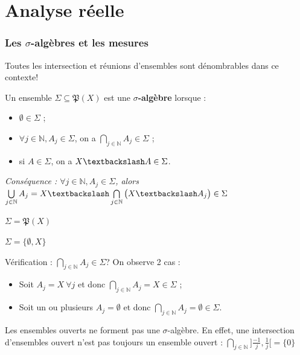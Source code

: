 \part{Analyse réelle}

\section{Les $\sigma$-algèbres et les mesures}
\danger Toutes les intersection et réunions d'ensembles sont dénombrables dans ce contexte!

\begin{definition}
    Un ensemble $\Sigma \subseteq \mathfrak{P}(X)$ est une \textbf{$\sigma$-algèbre} lorsque :
    \begin{itemize}
        \item $\emptyset \in\Sigma$ ;
        \item $\forall j\in\mathbb{N}, A_j\in \Sigma$, on a $\bigcap\limits_{j\in\mathbb{N}}A_j\in\Sigma$ ;
        \item si $A\in\Sigma$, on a $X\textbackslash A\in\Sigma$.
    \end{itemize}
\end{definition}
\textit{Conséquence : $\forall j\in\mathbb{N},A_j\in\Sigma$, alors $\bigcup\limits_{j\in\mathbb{N}}A_j=X\textbackslash\bigcap\limits_{j\in\mathbb{N}}\big(X\textbackslash A_j\big)\in\Sigma$}

\begin{example}
    $\Sigma = \mathfrak{P}(X)$
\end{example}
\begin{example}
    $\Sigma = \{\emptyset,X\}$
    
    Vérification : $\bigcap_{j\in\mathbb{N}} A_j \in\Sigma$? On observe 2 cas :
    \begin{itemize}
        \item Soit $A_j = X\ \forall j$ et donc $\bigcap_{j\in\mathbb{N}} A_j = X \in \Sigma$ ;
        \item Soit un ou plusieurs $A_j = \emptyset$ et donc $\bigcap_{j\in\mathbb{N}} A_j = \emptyset \in \Sigma$.
    \end{itemize}
\end{example}

\begin{example}
    Les ensembles ouverts ne forment pas une $\sigma$-algèbre. En effet, une intersection d'ensembles ouvert n'est pas toujours un ensemble ouvert : $\bigcap_{j\in\mathbb{N}} ]\frac{-1}{j},\frac{1}{j}[ = \{0\}$
\end{example}

